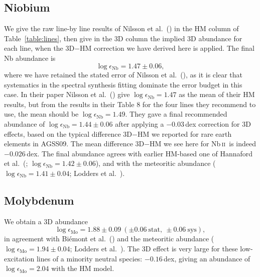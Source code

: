 \documentclass[traditabstract]{aa}
\newcommand{\altnbii}{Nb\,\textsc{ii}}
\newcommand{\nbii}{\altnbii\ }
\begin{document}
\subsection{Niobium}
We give the raw line-by line results of Nilsson et al.\ (\cite{nils}) in the HM column of Table~\ref{table:lines}, then give in the 3D column the implied 3D abundance for each line, when the 3D$-$HM correction we have derived here is applied.  The final Nb abundance is 
\begin{displaymath}
\log\epsilon_{\mathrm{Nb}}=1.47\pm0.06,
\end{displaymath}
where we have retained the stated error of Nilsson et al.\ (\cite{nils}), as it is clear that systematics in the spectral synthesis fitting dominate the error budget in this case.  In their paper Nilsson et al.\ (\cite{nils}) give $\log\epsilon_{\mathrm{Nb}}=1.47$ as the mean of their HM results, but from the results in their Table 8 for the four lines they recommend to use, the mean should be $\log\epsilon_{\mathrm{Nb}}=1.49$.  They gave a final recommended abundance of $\log\epsilon_{\mathrm{Nb}}=1.44\pm0.06$ after applying a $-0.03$\,dex correction for 3D effects, based on the typical difference 3D$-$HM we reported for rare earth elements in AGSS09.  The mean difference 3D$-$HM we see here for \nbii is indeed $-0.026$\,dex.  The final abundance agrees with earlier HM-based one of Hannaford et al.\ (\cite{hann2}; $\log\epsilon_{\mathrm{Nb}}=1.42\pm0.06$), and with the meteoritic abundance ($\log \epsilon_{\mathrm{Nb}}=1.41\pm0.04$; Lodders et al.\ \cite{lodd}).

\subsection{Molybdenum}
We obtain a 3D abundance
\begin{displaymath}
\log\epsilon_{\mathrm{Mo}}=1.88\pm0.09\ (\pm0.06\ \mathrm{stat},\ \pm0.06\ \mathrm{sys}),
\end{displaymath}
in agreement with Bi\'emont et al.\ (\cite{biem4}) and the meteoritic abundance ($\log \epsilon_{\mathrm{Mo}}=1.94\pm0.04$; Lodders et al.\ \cite{lodd}).  The 3D effect is very large for these low-excitation lines of a minority neutral species: $-0.16$\,dex, giving an abundance of $\log\epsilon_{\mathrm{Mo}}=2.04$ with the HM model.
\end{document}
